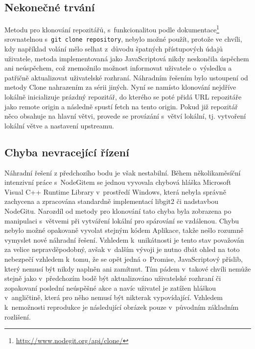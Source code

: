 \subsection{Nekonečné trvání}

Metodu pro klonování repozitářů, s~funkcionalitou podle dokumentace\footnote{\url{http://www.nodegit.org/api/clone/}} srovnatelnou s~\texttt{git clone repository}, nebylo možné použít, protože ve chvíli, kdy například volání mělo selhat z~důvodu špatných přístupových údajů uživatele, metoda implementovaná jako JavaScriptová  nikdy neskončila úspěchem ani neúspěchem, což znemožnilo možnost informovat uživatele o~výsledku a patřičně aktualizovat uživatelské rozhraní. Náhradním řešením bylo ustoupení od metody Clone nahrazením za sérii jiných. Nyní se namísto klonování nejdříve lokálně inicializuje prázdný repozitář, do kterého se poté přidá URL repozitáře jako remote origin a následně spustí fetch na tento origin. Pokud již repozitář něco obsahuje na hlavní větvi, provede se provázání s~větví lokální, tj. vytvoření lokální větve a nastavení upstreamu.

\subsection{Chyba nevracející řízení}

Náhradní řešení z předchozího bodu je však nestabilní. Během několikaměsíční intenzivní práce s~NodeGitem se jednou vyvovala chybová hláška Microsoft Visual C++ Runtime Library v~prostředí Windows, která nebyla správně zachycena a zpracována standardně implementací libgit2 či nadstavbou NodeGitu. Narozdíl od metody pro klonování tato chyba byla zobrazena po manipulaci s~větvemi při vytváření lokální pro spárování se vzdálenou. Chybu nebylo možné opakovaně vyvolat stejným kódem Aplikace, takže nešlo rozumně vymyslet nové náhradní řešení. Vzhledem k~unikátnosti je tento stav považován za velice nepravděpodobný, avšak v~dalším vývoji je nutno dbát ohled na toto nebezpečí vzhledem k~tomu, že se opět jedná o~Promise, JavaScriptový příslib, který nemusí být nikdy naplněn ani zamítnut. Tím pádem v~takové chvíli nemůže stejně jako v~předchozím bodě být aktualizováno uživatelské rozhraní či zopakovaní poslední neúspěšné akce a navíc uživatel je zatížen hláškou v~angličtině, která pro něho nemusí být nikterak vypovídající. Vzhledem k~nemožnosti reprodukce je následující obrázek pouze v~původním základním rozlišení.


